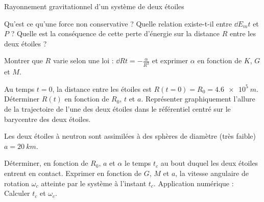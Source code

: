 \begin{exo}[PC][1][devoir]{Rayonnement gravitationnel d'un système de deux étoiles}
\begin{quest}
    \item Qu'est ce qu'une force non conservative ? Quelle relation existe-t-il entre $\dd{E_m}{t}$ et $P$ ?
    Quelle est la conséquence de cette perte d'énergie sur la distance $R$ entre les deux étoiles ?


    \item Montrer que $R$ varie selon une loi : $\dd{R}{t} = -\frac{\alpha}{R^3}$ et exprimer $\alpha$ en fonction de $K$, $G$ et
    $M$.

    \item Au temps $t = 0$, la distance entre les étoiles est $R(t = 0) = R_0=\SI{4.6e5}{m}$. Déterminer $R(t)$ en
    fonction de $R_0$, $t$ et $a$.
    Représenter graphiquement l'allure de la trajectoire de l'une des deux étoiles dans le référentiel
    centré sur le barycentre des deux étoiles.
    \end{quest}

    Les deux étoiles à neutron sont assimilées à des sphères de diamètre (très faible) $a = \SI{20}{km}$.

    \begin{quest}
    \item Déterminer, en fonction de $R_0$, $a$ et $\alpha$ le temps $t_c$ au bout duquel les deux étoiles entrent en
    contact. Exprimer en fonction de $G$, $M$ et $a$, la vitesse angulaire de rotation
    $\omega_c$ atteinte par le
    système à l'instant $t_c$.
    Application numérique : Calculer $t_c$ et $\omega_c$.


\end{quest}
\end{exo}
